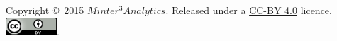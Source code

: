 \small{Copyright \copyright{}~2015 $Minter^3 Analytics$.
Released under a
\href{http://creativecommons.org/licenses/by/4.0/}{CC-BY 4.0}
licence. \hfill \includegraphics[width=0.75in]{./inc/png/cc-by.png}}.

\endinput
